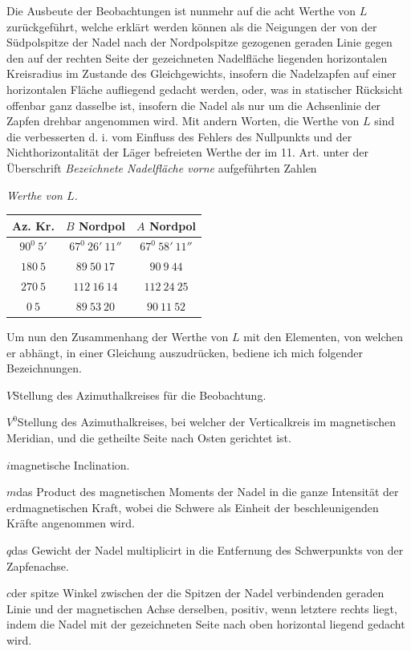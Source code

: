 Die Ausbeute der Beobachtungen ist nunmehr auf die acht Werthe von $L$ zurückgeführt, welche erklärt werden können als die Neigungen der von der Südpolspitze der Nadel nach der Nordpolspitze gezogenen geraden Linie gegen den auf der rechten Seite der gezeichneten Nadelfläche liegenden horizontalen Kreisradius im Zustande des Gleichgewichts, insofern die Nadelzapfen auf einer horizontalen Fläche aufliegend gedacht werden, oder, was in statischer Rücksicht offenbar ganz dasselbe ist, insofern die Nadel als nur um die Achsenlinie der Zapfen drehbar angenommen wird. Mit andern Worten, die Werthe von $L$ sind die verbesserten d. i. vom Einfluss des Fehlers des Nullpunkts und der Nichthorizontalität der Läger befreieten Werthe der im 11. Art. unter der Überschrift \textit{Bezeichnete Nadelfläche vorne} aufgeführten Zahlen
\begin{center}
\textit{Werthe von $L$.}\par\smallskip
\begin{tabular}{c|c|c}
Az. Kr.&$B$ Nordpol&$A$ Nordpol\\\hline
$90^0\ 5'$&$67^0\ 26'\ 11''$&$67^0\ 58'\ 11''$\\
$180\ 5$&$89\ 50\ 17$&$90\ 9\ 44$\\
$270\ 5$&$112\ 16\ 14$&$112\ 24\ 25$\\
$0\ 5$&$89\ 53\ 20$&$90\ 11\ 52$
\end{tabular}
\end{center}

Um nun den Zusammenhang der Werthe von $L$ mit den Elementen, von welchen er abhängt, in einer Gleichung auszudrücken, bediene ich mich folgender Bezeichnungen.

$V$\quad Stellung des Azimuthalkreises für die Beobachtung.

$V^0$\quad Stellung des Azimuthalkreises, bei welcher der Verticalkreis im magnetischen Meridian, und die getheilte Seite nach Osten gerichtet ist.

$i$\quad magnetische Inclination.


\par\clearpage
{}$m$\quad das Product des magnetischen Moments der Nadel in die ganze Intensität der erdmagnetischen Kraft, wobei die Schwere als Einheit der beschleunigenden Kräfte angenommen wird.

$q$\quad das Gewicht der Nadel multiplicirt in die Entfernung des Schwerpunkts von der Zapfenachse.

$c$\quad der spitze Winkel zwischen der die Spitzen der Nadel verbindenden geraden Linie und der magnetischen Achse derselben, positiv, wenn letztere rechts liegt, indem die Nadel mit der gezeichneten Seite nach oben horizontal liegend gedacht wird.

